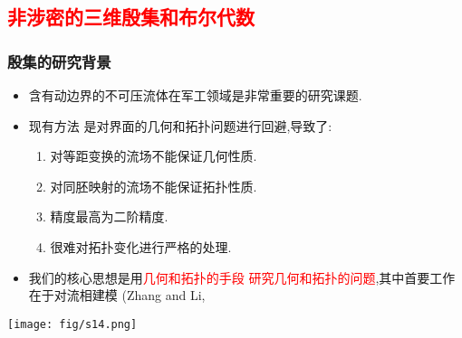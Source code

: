 \documentclass[UTF8]{ctexbeamer}	%
\theoremstyle{plain}
\theoremstyle{definition}
\theoremstyle{remark}
\numberwithin{equation}{section}
\begin{document}
\subsection{\textcolor{red}{非涉密的三维殷集和布尔代数}}
\begin{frame}
    \frametitle{殷集的研究背景}
    \begin{itemize}
        \item 含有动边界的不可压流体在军工领域是非常重要的研究课题.
        \item 现有方法
              是对界面的几何和拓扑问题进行回避,导致了:
              \begin{enumerate}
                  \item 对等距变换的流场不能保证几何性质.
                  \item 对同胚映射的流场不能保证拓扑性质.
                  \item 精度最高为二阶精度.
                  \item 很难对拓扑变化进行严格的处理.
              \end{enumerate}
        \item 我们的核心思想是用\textcolor{red}{几何和拓扑的手段
                  研究几何和拓扑的问题},其中首要工作在于对流相建模
              (Zhang and Li, 





    \end{itemize}
    \begin{center}
        \texttt{[image: fig/s14.png]}
    \end{center}
\end{frame}
\end{document}
